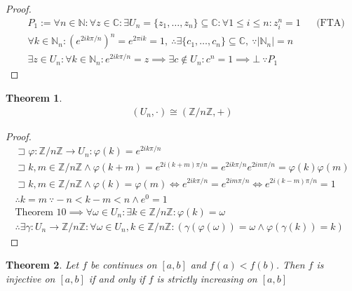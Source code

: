 \documentclass[a4paper,11pt]{article}
\theoremstyle{plain}
\newtheorem{theorem}{Theorem}
\theoremstyle{definition}
\newcommand{\N}{\mathbb{N}}
\newcommand{\Z}{\mathbb{Z}}
\newcommand{\C}{\mathbb{C}}
\newcommand{\iff}{\Longleftrightarrow}
\newcommand{\lett}{\sqsupset}
\begin{document}
\begin{proof}
\begin{align*}
	&P_1:=
	\forall n \in \N: \forall z\in \C: \exists U_n= \{z_1,\dots,z_n\} 
	\subseteq \C:
	\forall 1 \leq i \leq n: z_i^n = 1 
	&& \text{(FTA)} \\
	&\forall k \in \N_n: {\left(e^{2ik \pi /n}\right)}^n = e^{2\pi i k} = 1,\
	\therefore \exists \{c_1,\dots,c_n\} \subseteq
	\C,\ \because\left|\N_n\right|=n \\
	&\exists z\in U_n : \forall k \in \N_n: e^{2ik \pi /n} = z \implies
	\exists c \notin U_n: c^n = 1 \implies \bot\ \because P_1
\end{align*}
\end{proof}
\begin{theorem}
\begin{align*}
	(U_n,\cdot) \cong (\Z/n\Z,+)
\end{align*}
\end{theorem}
\begin{proof}
\begin{align*}
	\lett\varphi:\Z/n\Z \rightarrow U_n: \varphi(k)=e^{2ik \pi /n}\\
	\lett k,m\in\Z/n\Z\land\varphi(k+m)=e^{2i(k+m) \pi /n}
	=e^{2ik \pi /n}e^{2im \pi/n}
	=\varphi(k)\varphi(m)\\
	\lett k,m\in\Z/n\Z\land \varphi(k)=\varphi(m)\iff e^{2ik \pi /n}
	=e^{2im \pi/n}
	\iff e^{2i(k-m) \pi /n}=1\\
	\therefore k=m\ \because -n<k-m<n \land e^0=1\\
	\text{Theorem 10}\implies\forall \omega\in U_n:\exists 
	k\in\Z/n\Z:\varphi(k)=\omega\\
	\therefore \exists \gamma:U_n\rightarrow \Z/n\Z:\forall \omega\in U_n,k\in
	\Z/n\Z:(\gamma(\varphi(\omega))=\omega\land\varphi(\gamma(k))=k)
\end{align*}
\end{proof}
\begin{theorem}
	Let $f$ be continues on $[a,b]$ and $f(a)<f(b)$. Then $f$ is
	injective on $[a,b]$ if and only if $f$ is strictly increasing
	on $[a,b]$
\end{theorem}
\end{document}
